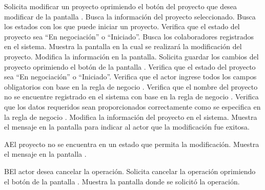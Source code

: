  \begin{UCtrayectoria}
    \UCpaso[\UCactor] Solicita modificar un proyecto oprimiendo el botón \btnEditar del proyecto que desea modificar de la pantalla .
    \UCpaso[\UCsist] Busca la información del proyecto seleccionado.
    \UCpaso[\UCsist] Busca los estados con los que puede iniciar un proyecto.
    \UCpaso[\UCsist] Verifica que el estado del proyecto sea ``En negociación'' o ``Iniciado''. 
    \UCpaso[\UCsist] Busca los colaboradores registrados en el sistema.
    \UCpaso[\UCsist] Muestra la pantalla  en la cual se realizará la modificación del proyecto. 
    \UCpaso[\UCactor] Modifica la información en la pantalla. \label{cu1.2:ingresaDatos}
    \UCpaso[\UCactor] Solicita guardar los cambios del proyecto oprimiendo el botón  de la pantalla .  
    \UCpaso[\UCsist] Verifica que el estado del proyecto sea ``En negociación'' o ``Iniciado''. 
    \UCpaso[\UCsist] Verifica que el actor ingrese todos los campos obligatorios con base en la regla de negocio  . 
    \UCpaso[\UCsist] Verifica que el nombre del proyecto no se encuentre registrado en el sistema con base en la regla de negocio  . 
    \UCpaso[\UCsist] Verifica que los datos requeridos sean proporcionados correctamente como se especifica en la regla de negocio .  
    \UCpaso[\UCsist] Modifica la información del proyecto en el sistema. 
    \UCpaso[\UCsist] Muestra el mensaje  en la pantalla 
    para indicar al actor que la modificación fue exitosa.
 \end{UCtrayectoria}
 \begin{UCtrayectoriaA}{A}{El proyecto no se encuentra en un estado que permita la modificación.}
    \UCpaso[\UCsist] Muestra el mensaje  en la pantalla .
 \end{UCtrayectoriaA} 
 \begin{UCtrayectoriaA}{B}{El actor desea cancelar la operación.}
    \UCpaso[\UCactor] Solicita cancelar la operación oprimiendo el botón  de la pantalla .
    \UCpaso[\UCsist] Muestra la pantalla donde se solicitó la operación.
 \end{UCtrayectoriaA} 
